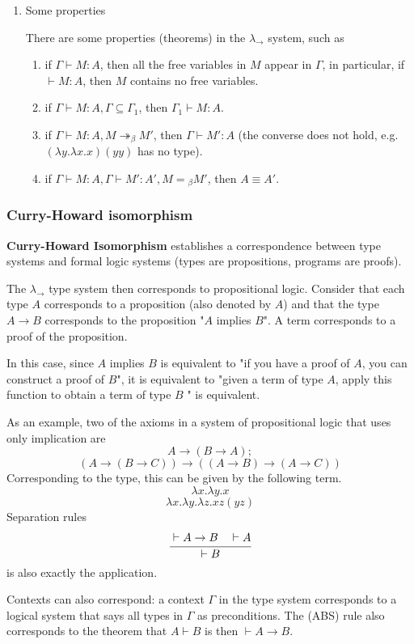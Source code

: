 \documentclass[a4paper]{exam}
\begin{document}
\begin{enumerate}
\item Some properties

There are some properties (theorems) in the $\lambda_\to$ system, such as

\begin{enumerate}
  \item if $\Gamma\vdash M:A$, then all the free variables in $M$ appear in $\Gamma$, in particular, if $\vdash M:A$, then $M$ contains no free variables.
  \item if $\Gamma \vdash M:A, \Gamma\subseteq\Gamma_1$, then $\Gamma_1\vdash M:A$.
  \item if $\Gamma\vdash M:A,M\twoheadrightarrow _ \beta M'$, then $\Gamma\vdash M':A$ (the converse does not hold, e.g. $(\lambda y.\lambda x.x)(yy)$ has no type).
  \item if $\Gamma\vdash M:A,\Gamma\vdash M':A',M={ }_\beta M'$, then $A\equiv A'$.
\end{enumerate}
\end{enumerate}
\subsubsection{Curry-Howard isomorphism \cite{softwarefoundation}}

\textbf{Curry-Howard Isomorphism} establishes a correspondence between type systems and formal logic systems (types are propositions, programs are proofs).

The $\lambda_\to$ type system then corresponds to propositional logic. Consider that each type $A$ corresponds to a proposition (also denoted by $A$) and that the type $A\to B$ corresponds to the proposition "$A$ implies $B$". A term corresponds to a proof of the proposition.

In this case, since $A$ implies $B$ is equivalent to "if you have a proof of $A$, you can construct a proof of $B$", it is equivalent to "given a term of type $A$, apply this function to obtain a term of type $B$ " is equivalent.

As an example, two of the axioms in a system of propositional logic that uses only implication are
$$A\to (B\to A);$$
$$(A\to(B\to C))\to((A\to B)\to(A\to C))$$
Corresponding to the type, this can be given by the following term.
$$
  \lambda x.\lambda y.x$$
$$  \lambda x.\lambda y.\lambda z.xz(yz)
$$
Separation rules
$$
  \cfrac{\vdash A\to B\quad\vdash A}{\vdash B}
$$
is also exactly the application.

Contexts can also correspond: a context $\Gamma$ in the type system corresponds to a logical system that says all types in $\Gamma$ as preconditions. The (ABS) rule also corresponds to the theorem that $A\vdash B$ is then $\vdash A\to B$.
\end{document}
